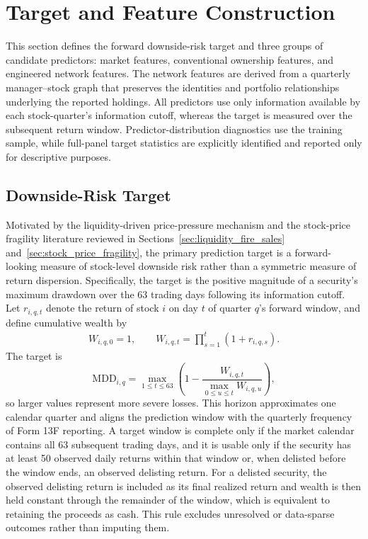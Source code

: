 \section{Target and Feature Construction}
\label{sec:feature_construction}

This section defines the forward downside-risk target and three groups of candidate predictors: market features, conventional ownership features, and engineered network features. The network features are derived from a quarterly manager--stock graph that preserves the identities and portfolio relationships underlying the reported holdings. All predictors use only information available by each stock-quarter's information cutoff, whereas the target is measured over the subsequent return window. Predictor-distribution diagnostics use the training sample, while full-panel target statistics are explicitly identified and reported only for descriptive purposes.

\subsection{Downside-Risk Target}
\label{sec:target_definition}

Motivated by the liquidity-driven price-pressure mechanism and the stock-price fragility literature reviewed in Sections~\ref{sec:liquidity_fire_sales} and~\ref{sec:stock_price_fragility}, the primary prediction target is a forward-looking measure of stock-level downside risk rather than a symmetric measure of return dispersion. Specifically, the target is the positive magnitude of a security's maximum drawdown over the 63 trading days following its information cutoff. Let $r_{i,q,t}$ denote the return of stock $i$ on day $t$ of quarter $q$'s forward window, and define cumulative wealth by
\begin{equation}
    \begin{aligned}
        W_{i,q,0}=1,
        \qquad
        W_{i,q,t}=\prod_{s=1}^{t}\left(1+r_{i,q,s}\right).
    \end{aligned}
    \label{eq:cumulative_wealth}
\end{equation}
\noindent
The target is
\begin{equation}
    \mathrm{MDD}_{i,q}
    = \max_{1\leq t\leq 63}
    \left(
    1-
    \frac{W_{i,q,t}}
    {\max_{0\leq u\leq t}W_{i,q,u}}
    \right),
    \label{eq:maximum_drawdown}
\end{equation}
\noindent
so larger values represent more severe losses. This horizon approximates one calendar quarter and aligns the prediction window with the quarterly frequency of Form 13F reporting. A target window is complete only if the market calendar contains all 63 subsequent trading days, and it is usable only if the security has at least 50 observed daily returns within that window or, when delisted before the window ends, an observed delisting return. For a delisted security, the observed delisting return is included as its final realized return and wealth is then held constant through the remainder of the window, which is equivalent to retaining the proceeds as cash. This rule excludes unresolved or data-sparse outcomes rather than imputing them.

